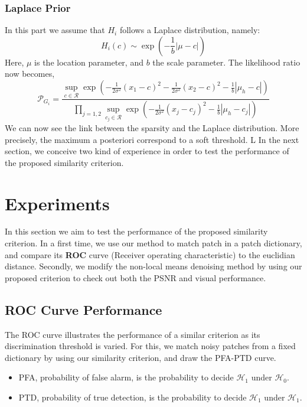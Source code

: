 \documentclass[runningheads]{llncs}
\newcommand{\wdist}[3]{\frac{1}{2#3}(#1-#2 )^2}
\begin{document}
\subsubsection{Laplace Prior}
In this part we assume that $H_i$ follows a Laplace distribution, namely:
\begin{equation}
 H_i(c) \sim \exp(-\frac{1}{b}|\mu-c|)
\end{equation}
Here, $\mu$ is the location parameter, and $b$ the scale parameter. The likelihood ratio now becomes,
\[
 \mathcal{P}_{G_i} = \frac{\sup_{c\in \mathcal{R}} \exp(-\wdist{x_1}{c}{\sigma^2}-\wdist{x_2}{c}{\sigma^2}-\frac{1}{b}|\mu_h-c|) }
{\prod_{j=1,2}\sup_{c_j\in \mathcal{R}} \exp(-\frac{1}{2\sigma^2}(x_j-c_j )^2-\frac{1}{b}|\mu_h-c_j|)  }
\]
We can now see the link between the sparsity and the Laplace distribution. More precisely, the maximum a posteriori correspond to a soft threshold. L
In the next section, we conceive two kind of experience in order to test the performance of the proposed similarity criterion.

\section{Experiments}
In this section we aim to test the performance of the proposed similarity criterion. In a first time, we use our method to match patch in a patch dictionary, and compare its \textbf{ROC} curve (Receiver operating characteristic) to the euclidian distance. Secondly, we modify the non-local means denoising method by using our proposed criterion to check out both the PSNR and visual performance.
\subsection{ROC Curve Performance}
The ROC curve illustrates the performance of a similar criterion as its discrimination threshold is varied. For this, we match noisy patches from a fixed dictionary by using our similarity criterion, and draw the PFA-PTD curve. 
\begin{itemize}
 \item PFA, probability of false alarm, is the probability to decide $\mathcal{H}_1$ under $\mathcal{H}_0$.
 \item PTD, probability of true detection, is the probability to decide $\mathcal{H}_1$ under $\mathcal{H}_1$.
\end{itemize}
\end{document}
